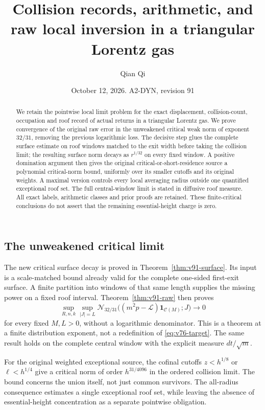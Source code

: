 \documentclass[11pt,reqno]{amsart}
\title[Collision records and raw local inversion]{Collision records, arithmetic, and raw local inversion in a triangular Lorentz gas}
\author{Qian Qi}
\date{October 12, 2026. A2-DYN, revision 91}
\numberwithin{equation}{section}
\theoremstyle{definition}
\theoremstyle{remark}\newtheorem{remark}[theorem]{Remark}
\newcommand{\one}{\mathbf1}\newcommand{\dd}{\,\mathrm d}
\begin{document}
\raggedbottom
\begin{abstract}
We retain the pointwise local limit problem for the exact displacement,
collision-count, occupation and roof record of actual returns in a
triangular Lorentz gas. We prove convergence of the original raw error
in the unweakened critical weak norm of exponent $32/31$, removing the
previous logarithmic loss. The decisive step glues the complete surface
estimate on roof windows matched to the exit width before taking the
collision limit; the resulting surface norm decays as $r^{1/32}$ on
every fixed window. A positive domination argument then gives the
original critical-or-short-residence source a polynomial critical-norm
bound, uniformly over its smaller cutoffs and its original weights.
A maximal version controls every local averaging radius outside one
quantified exceptional roof set. The full central-window limit is
stated in diffusive roof measure. All exact labels, arithmetic classes
and prior proofs are retained. These finite-critical conclusions do
not assert that the remaining essential-height charge is zero.
\end{abstract}
\maketitle



\subsection{The unweakened critical limit}
The new critical surface decay is proved in
Theorem~\ref{thm:v91-surface}. Its input is a scale-matched bound
already valid for the complete one-sided first-exit surface. A finite
partition into windows of that same length supplies the missing power
on a fixed roof interval. Theorem~\ref{thm:v91-raw} then proves
\[
 \sup_{R,n,k}\sup_{|J|=L}
 \mathcal N_{32/31}\bigl((m^2p-\mathcal L)\one_{\mathcal C(M)};J\bigr)
                                      \longrightarrow0
\]
for every fixed $M,L>0$, without a logarithmic denominator. This is
a theorem at a finite distribution exponent, not a redefinition of
\eqref{eq:v76-target}. The same result holds on the complete central
window with the explicit measure $dt/\sqrt m$.

For the original weighted exceptional source, the cofinal cutoffs
$z<h^{1/8}$ or $\ell<h^{1/4}$ give a critical norm of order
$h^{31/4096}$ in the ordered collision limit. The bound concerns the
union itself, not just common survivors. The all-radius consequence
estimates a single exceptional roof set, while leaving the absence
of essential-height concentration as a separate pointwise obligation.
\end{document}
